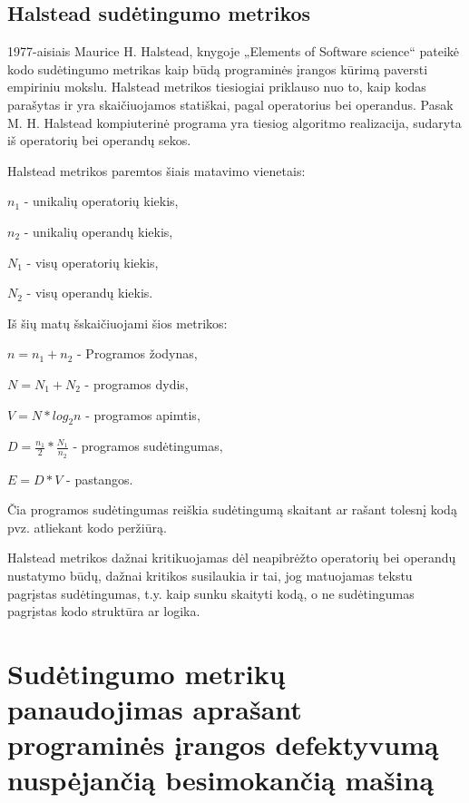 \documentclass{VUMIFPSbakalaurinis}
\begin{document}
\subsection{Halstead sudėtingumo metrikos}
1977-aisiais Maurice H. Halstead, knygoje „Elements of Software science“ pateikė kodo sudėtingumo metrikas kaip būdą programinės įrangos kūrimą paversti empiriniu mokslu. Halstead metrikos tiesiogiai priklauso nuo to, kaip kodas parašytas ir yra skaičiuojamos statiškai, pagal operatorius bei operandus. Pasak M. H. Halstead kompiuterinė programa yra tiesiog algoritmo realizacija, sudaryta iš operatorių bei operandų sekos.\cite{Halstead:1977:ESS:540137}

Halstead metrikos paremtos šiais matavimo vienetais:
\begin{description}  
\item\(n_1\) - unikalių operatorių kiekis,
\item\(n_2\) - unikalių operandų kiekis,
\item\(N_1\) - visų operatorių kiekis,
\item\(N_2\) - visų operandų kiekis.
\end{description} 
Iš šių matų šskaičiuojami šios metrikos:
\begin{description}  
\item\(n =  n_1 + n_2\) - Programos žodynas,
\item\(N = N_1 + N_2\) - programos dydis,
\item\(V = N * log_2n\) - programos apimtis,
\item\(D = \frac{n_1}{2} * \frac{N_1}{n_2}\) - programos sudėtingumas,
\item\(E = D * V\) - pastangos.
\end{description} 
Čia programos sudėtingumas reiškia sudėtingumą skaitant ar rašant tolesnį kodą pvz. atliekant kodo peržiūrą.

Halstead metrikos dažnai kritikuojamas dėl neapibrėžto operatorių bei operandų nustatymo būdų, dažnai kritikos susilaukia ir tai, jog matuojamas tekstu pagrįstas sudėtingumas, t.y. kaip sunku skaityti kodą, o ne sudėtingumas pagrįstas kodo struktūra ar logika.

\section{Sudėtingumo metrikų panaudojimas aprašant programinės įrangos defektyvumą nuspėjančią besimokančią mašiną}
\end{document}
